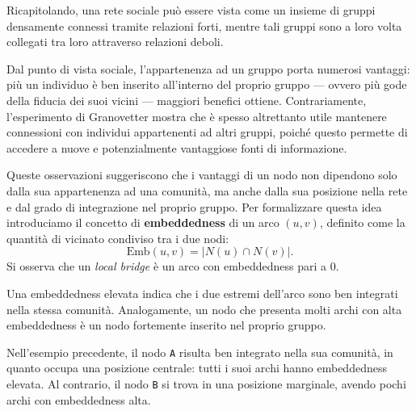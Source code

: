 Ricapitolando, una rete sociale può essere vista come un insieme di gruppi 
densamente connessi tramite relazioni forti, mentre tali gruppi sono a loro volta 
collegati tra loro attraverso relazioni deboli.

Dal punto di vista sociale, l'appartenenza ad un gruppo porta numerosi vantaggi: 
più un individuo è ben inserito all'interno del proprio gruppo --- ovvero più gode 
della fiducia dei suoi vicini --- maggiori benefici ottiene. Contrariamente, 
l'esperimento di Granovetter mostra che è spesso altrettanto utile mantenere 
connessioni con individui appartenenti ad altri gruppi, poiché questo permette 
di accedere a nuove e potenzialmente vantaggiose fonti di informazione.

Queste osservazioni suggeriscono che i vantaggi di un nodo non dipendono solo 
dalla sua appartenenza ad una comunità, ma anche dalla sua posizione nella rete 
e dal grado di integrazione nel proprio gruppo. Per formalizzare questa idea 
introduciamo il concetto di \textbf{embeddedness} di un arco $(u,v)$, definito come 
la quantità di vicinato condiviso tra i due nodi:
\[
\text{Emb}(u,v) = |N(u) \cap N(v)|.
\]
Si osserva che un \textit{local bridge} è un arco con embeddedness pari a $0$.

Una embeddedness elevata indica che i due estremi dell'arco sono ben integrati 
nella stessa comunità. Analogamente, un nodo che presenta molti archi con alta 
embeddedness è un nodo fortemente inserito nel proprio gruppo.

Nell'esempio precedente, il nodo \texttt{A} risulta ben integrato nella sua 
comunità, in quanto occupa una posizione centrale: tutti i suoi archi hanno 
embeddedness elevata. Al contrario, il nodo \texttt{B} si trova in una posizione 
marginale, avendo pochi archi con embeddedness alta.


